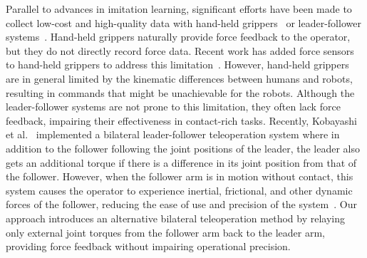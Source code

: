 Parallel to advances in imitation learning, significant efforts have been made to collect low-cost and high-quality data with hand-held grippers~\cite{song2020grasping, umi} or leader-follower systems~\cite{aloha, wu2024gello, bidex}. Hand-held grippers naturally provide force feedback to the operator, but they do not directly record force data. Recent work has added force sensors to hand-held grippers to address this limitation~\cite{liu2024forcemimic}. However, hand-held grippers are in general limited by the kinematic differences between humans and robots, resulting in commands that might be unachievable for the robots.
Although the leader-follower systems are not prone to this limitation, they often lack force feedback, impairing their effectiveness in contact-rich tasks. Recently, Kobayashi et al.~\cite{kobayashi2024alpha} implemented a bilateral leader-follower teleoperation system where in addition to the follower following the joint positions of the leader, the leader also gets an additional torque if there is a difference in its joint position from that of the follower.
However, when the follower arm is in motion without contact, this system causes the operator to experience inertial, frictional, and other dynamic forces of the follower, reducing the ease of use and precision of the system~\cite{siciliano2008springer}. Our approach introduces an alternative bilateral teleoperation method by relaying only external joint torques from the follower arm back to the leader arm, providing force feedback without impairing operational precision.